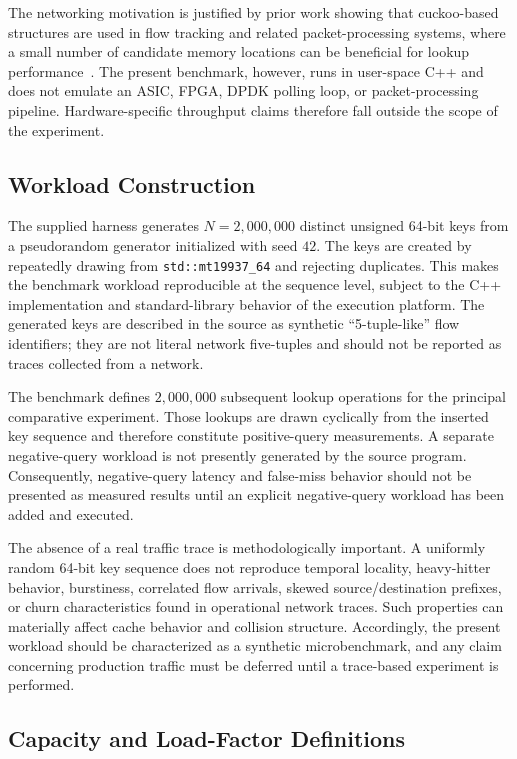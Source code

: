 \documentclass[conference]{IEEEtran}
\begin{document}
The networking motivation is justified by prior work showing that cuckoo-based
structures are used in flow tracking and related packet-processing systems,
where a small number of candidate memory locations can be beneficial for lookup
performance~\cite{pontarelli2016cuckoocache,lescouarnec2018cuckoopp}. The present
benchmark, however, runs in user-space C++ and does not emulate an ASIC, FPGA,
DPDK polling loop, or packet-processing pipeline. Hardware-specific throughput
claims therefore fall outside the scope of the experiment.

\subsection{Workload Construction}

The supplied harness generates $N=2{,}000{,}000$ distinct unsigned 64-bit keys
from a pseudorandom generator initialized with seed $42$. The keys are created
by repeatedly drawing from \texttt{std::mt19937\_64} and rejecting duplicates.
This makes the benchmark workload reproducible at the sequence level, subject
to the C++ implementation and standard-library behavior of the execution
platform. The generated keys are described in the source as synthetic
``5-tuple-like'' flow identifiers; they are not literal network five-tuples
and should not be reported as traces collected from a network.

The benchmark defines $2{,}000{,}000$ subsequent lookup operations for the
principal comparative experiment. Those lookups are drawn cyclically from the
inserted key sequence and therefore constitute positive-query measurements.
A separate negative-query workload is not presently generated by the source
program. Consequently, negative-query latency and false-miss behavior should
not be presented as measured results until an explicit negative-query workload
has been added and executed.

The absence of a real traffic trace is methodologically important. A uniformly
random 64-bit key sequence does not reproduce temporal locality, heavy-hitter
behavior, burstiness, correlated flow arrivals, skewed source/destination
prefixes, or churn characteristics found in operational network traces. Such
properties can materially affect cache behavior and collision structure.
Accordingly, the present workload should be characterized as a synthetic
microbenchmark, and any claim concerning production traffic must be deferred
until a trace-based experiment is performed.

\subsection{Capacity and Load-Factor Definitions}
\end{document}
